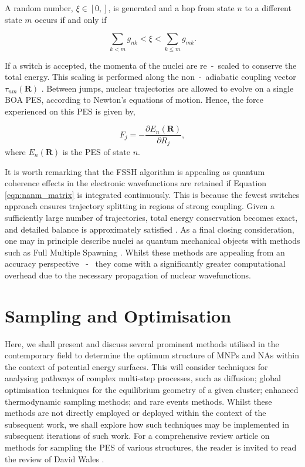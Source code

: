 A random number, $\xi \in \left[ 0, \right]$, is generated and a hop from state $n$ to a different state $m$ occurs if and only if 

\begin{equation}
    \sum_{k < m} g_{nk} < \xi < \sum_{k\leq m} g_{mk}.
\end{equation}

If a switch is accepted, the momenta of the nuclei are re~-~scaled to conserve the total energy. This scaling is performed along the non~-~adiabatic coupling vector $\tau_{nm}(\textbf{R})$ \cite{10.1063/1.470173}. Between jumps, nuclear trajectories are allowed to evolve on a single BOA PES, according to Newton's equations of motion. Hence, the force experienced on this PES is given by,

\begin{equation}
    F_{j} = - \frac{\partial E_{n}(\textbf{R})}{\partial R_{j}},
\end{equation}
where $E_{n}(\textbf{R})$ is the PES of state $n$.

It is worth remarking that the FSSH algorithm is appealing as quantum coherence effects in the electronic wavefunctions are retained if Equation \ref{eqn:nanm_matrix} is integrated continuously. This is because the fewest switches approach ensures trajectory splitting in regions of strong coupling. Given a sufficiently large number of trajectories, total energy conservation becomes exact, and detailed balance is approximately satisfied \cite{10.1063/1.2955564}. As a final closing consideration, one may in principle describe nuclei as quantum mechanical objects with methods such as Full Multiple Spawning \cite{TDDFT_Fun_Book,doi:10.1021/acs.jpclett.6b02660,10.1063/1.5036787}. Whilst these methods are appealing from an accuracy perspective ~-~ they come with a significantly greater computational overhead due to the necessary propagation of nuclear wavefunctions.

\section{Sampling and Optimisation}
\label{sec:md_opt}

Here, we shall present and discuss several prominent methods utilised in the contemporary field to determine the optimum structure of MNPs and NAs within the context of potential energy surfaces. This will consider techniques for analysing pathways of complex multi-step processes, such as diffusion; global optimisation techniques for the equilibrium geometry of a given cluster; enhanced thermodynamic sampling methods; and rare events methods. Whilst these methods are not directly employed  or deployed within the context of the subsequent work, we shall explore how such techniques may be implemented in subsequent iterations of such work. For a comprehensive review article on methods for sampling the PES of various structures, the reader is invited to read the review of David Wales \cite{doi:10.1146/annurev-physchem-050317-021219}.

